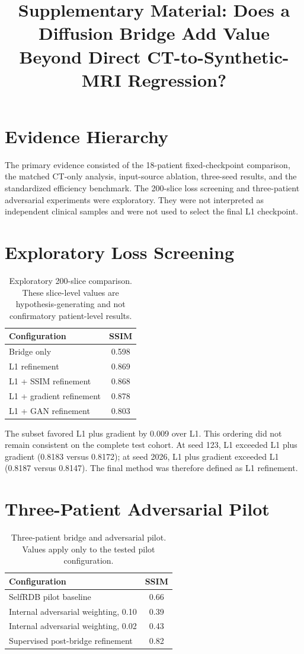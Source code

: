 \documentclass[11pt,a4paper]{article}
\title{Supplementary Material: Does a Diffusion Bridge Add Value Beyond Direct CT-to-Synthetic-MRI Regression?}
\author{}
\date{}
\begin{document}
\maketitle

\section{Evidence Hierarchy}

The primary evidence consisted of the 18-patient fixed-checkpoint comparison, the matched CT-only analysis, input-source ablation, three-seed results, and the standardized efficiency benchmark. The 200-slice loss screening and three-patient adversarial experiments were exploratory. They were not interpreted as independent clinical samples and were not used to select the final L1 checkpoint.

\section{Exploratory Loss Screening}

\begin{table}[htbp]
\centering
\caption{Exploratory 200-slice comparison. These slice-level values are hypothesis-generating and not confirmatory patient-level results.}
\begin{tabular}{lc}
\toprule
Configuration & SSIM\\
\midrule
Bridge only & 0.598\\
L1 refinement & 0.869\\
L1 + SSIM refinement & 0.868\\
L1 + gradient refinement & 0.878\\
L1 + GAN refinement & 0.803\\
\bottomrule
\end{tabular}
\end{table}

The subset favored L1 plus gradient by 0.009 over L1. This ordering did not remain consistent on the complete test cohort. At seed 123, L1 exceeded L1 plus gradient (0.8183 versus 0.8172); at seed 2026, L1 plus gradient exceeded L1 (0.8187 versus 0.8147). The final method was therefore defined as L1 refinement.

\section{Three-Patient Adversarial Pilot}

\begin{table}[htbp]
\centering
\caption{Three-patient bridge and adversarial pilot. Values apply only to the tested pilot configuration.}
\begin{tabular}{lc}
\toprule
Configuration & SSIM\\
\midrule
SelfRDB pilot baseline & 0.66\\
Internal adversarial weighting, 0.10 & 0.39\\
Internal adversarial weighting, 0.02 & 0.43\\
Supervised post-bridge refinement & 0.82\\
\bottomrule
\end{tabular}
\end{table}
\end{document}
